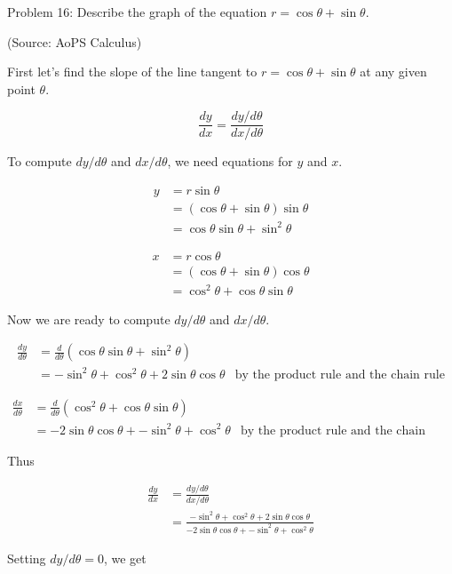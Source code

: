 Problem 16: Describe the graph of the equation $r = \cos \theta + \sin \theta$.

(Source: AoPS Calculus)

First let's find the slope of the line tangent to $r = \cos \theta + \sin \theta$ at any given point $\theta$.

$$ \frac{dy}{dx} = \frac{dy/d\theta}{dx/d\theta} $$

To compute $dy/d\theta$ and $dx/d\theta$, we need equations for $y$ and $x$.

\begin{align*}
y &= r \sin \theta \\
&= \left(\cos \theta + \sin \theta\right) \sin \theta \\
&= \cos \theta \sin \theta + \sin^2 \theta
\end{align*}

\begin{align*}
x &= r \cos \theta \\
&= \left(\cos \theta + \sin \theta\right) \cos \theta \\
&= \cos^2 \theta + \cos \theta \sin \theta
\end{align*}

Now we are ready to compute $dy/d\theta$ and $dx/d\theta$.

\begin{align*}
\frac{dy}{d\theta} &= \frac{d}{d\theta} \left(\cos \theta \sin \theta + \sin^2 \theta\right) \\
&= -\sin^2 \theta + \cos^2 \theta + 2 \sin \theta \cos \theta & \text{by the product rule and the chain rule}
\end{align*}

\begin{align*}
\frac{dx}{d\theta} &= \frac{d}{d\theta} \left(\cos^2 \theta + \cos \theta \sin \theta\right) \\
&= -2 \sin \theta \cos \theta + -\sin^2 \theta + \cos^2 \theta & \text{by the product rule and the chain rule}
\end{align*}

Thus

\begin{align*}
\frac{dy}{dx} &= \frac{dy/d\theta}{dx/d\theta} \\
&= \frac{-\sin^2 \theta + \cos^2 \theta + 2 \sin \theta \cos \theta}{-2 \sin \theta \cos \theta + -\sin^2 \theta + \cos^2 \theta}
\end{align*}

Setting $dy/d\theta = 0$, we get

